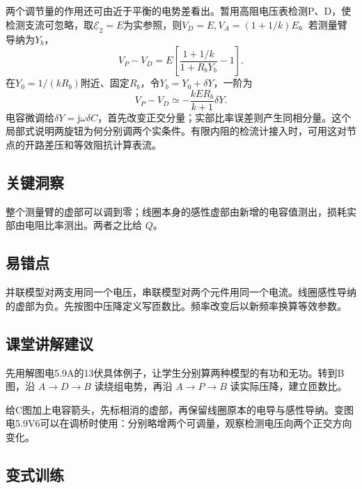 \documentclass[UTF8,fontset=fandol,a4paper,11pt]{ctexart}
\begin{document}
两个调节量的作用还可由近于平衡的电势差看出。暂用高阻电压表检测P、D，使检测支流可忽略，取$\underline{\mathcal E}_2=E$为实参照，则$V_D=E,V_A=(1+1/k)E$。若测量臂导纳为$Y_b$，
\[
V_P-V_D=E\left[\frac{1+1/k}{1+R_bY_b}-1\right].
\]
在$Y_0=1/(kR_b)$附近、固定$R_b$，令$Y_b=Y_0+\delta Y$，一阶为
\[
V_P-V_D\simeq-\frac{kER_b}{k+1}\delta Y.
\]
电容微调给$\delta Y=\mathrm j\omega\delta C$，首先改变正交分量；实部比率误差则产生同相分量。这个局部式说明两旋钮为何分别调两个实条件。有限内阻的检流计接入时，可用这对节点的开路差压和等效阻抗计算表流。




\subsection*{关键洞察}

整个测量臂的虚部可以调到零；线圈本身的感性虚部由新增的电容值测出，损耗实部由电阻比率测出。两者之比给 $Q$。



\subsection*{易错点}

并联模型对两支用同一个电压，串联模型对两个元件用同一个电流。线圈感性导纳的虚部为负。先按图中压降定义写匝数比。频率改变后以新频率换算等效参数。



\subsection*{课堂讲解建议}

先用解图电5.9A的13伏具体例子，让学生分别算两种模型的有功和无功。转到B图，沿 $A\to D\to B$ 读绕组电势，再沿 $A\to P\to B$ 读实际压降，建立匝数比。

给C图加上电容箭头，先标相消的虚部，再保留线圈原本的电导与感性导纳。变图电5.9V6可以在调桥时使用：分别略增两个可调量，观察检测电压向两个正交方向变化。


\subsection*{变式训练}
\end{document}

